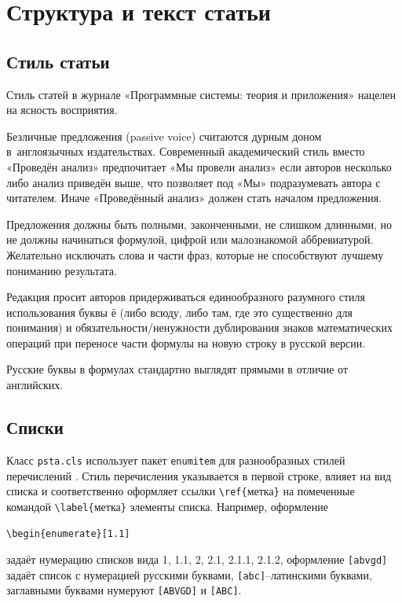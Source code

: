 \documentclass{psta}%
\begin{document}
\section{Структура и текст статьи}\label{sec:text}
\subsection{Стиль статьи}
Стиль статей в журнале «Программные системы: теория и приложения» нацелен на ясность восприятия.

Безличные предложения (passive voice) считаются дурным доном в~англоязычных издательствах.
Современный академический стиль вместо «Проведён анализ» предпочитает «Мы провели анализ» если авторов несколько либо
анализ приведён выше, что позволяет под «Мы» подразумевать автора с читателем. Иначе «Проведённый анализ» должен стать началом предложения.

Предложения должны быть полными, законченными, не слишком длинными, но не должны начинаться формулой, цифрой или малознакомой аббревиатурой.
Желательно исключать слова и части фраз, которые не способствуют лучшему пониманию результата.

Редакция просит авторов придерживаться единообразного разумного стиля использования буквы ё (либо всюду, либо там, где это существенно для понимания)
и обязательности/ненужности дублирования знаков математических операций при переносе части формулы на новую строку в русской версии.

Русские буквы в формулах стандартно выглядят прямыми в отличие от английских.

\subsection{Списки}
Класс \verb|psta.cls| использует пакет \verb|enumitem| для разнообразных стилей перечислений .
Стиль перечисления указывается в первой строке, влияет на вид списка и соответственно оформляет ссылки \verb|\ref{|метка\verb|}| на помеченные командой \verb|\label{|метка\verb|}| элементы списка.
Например, оформление

\verb|\begin{enumerate}[1.1]|

\noindent
задаёт нумерацию списков  вида 1, 1.1, 2, 2.1, 2.1.1, 2.1.2, оформление \verb|[abvgd]| задаёт список с нумерацией русскими буквами, \verb|[abc]|\---латинскими буквами, заглавными буквами нумеруют \verb|[ABVGD]| и \verb|[ABC]|.
\end{document}

